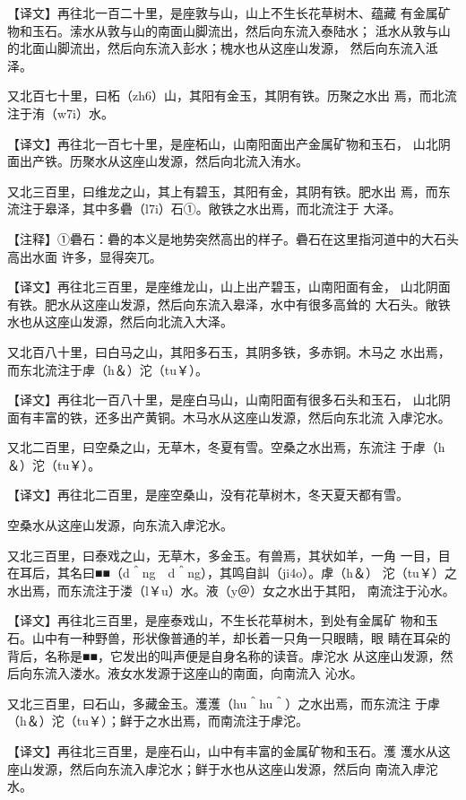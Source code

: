 \documentclass[a4paper,12pt,UTF8,twoside]{ctexbook}
\begin{document}
【译文】再往北一百二十里，是座敦与山，山上不生长花草树木、蕴藏 有金属矿物和玉石。溹水从敦与山的南面山脚流出，然后向东流入泰陆水； 泜水从敦与山的北面山脚流出，然后向东流入彭水；槐水也从这座山发源， 然后向东流入泜泽。

又北百七十里，曰柘（zh6）山，其阳有金玉，其阴有铁。历聚之水出 焉，而北流注于洧（w7i）水。

【译文】再往北一百七十里，是座柘山，山南阳面出产金属矿物和玉石， 山北阴面出产铁。历聚水从这座山发源，然后向北流入洧水。

又北三百里，曰维龙之山，其上有碧玉，其阳有金，其阴有铁。肥水出 焉，而东流注于皋泽，其中多礨（l7i）石①。敞铁之水出焉，而北流注于 大泽。

【注释】①礨石：礨的本义是地势突然高出的样子。礨石在这里指河道中的大石头高出水面 许多，显得突兀。

【译文】再往北三百里，是座维龙山，山上出产碧玉，山南阳面有金， 山北阴面有铁。肥水从这座山发源，然后向东流入皋泽，水中有很多高耸的 大石头。敞铁水也从这座山发源，然后向北流入大泽。

又北百八十里，曰白马之山，其阳多石玉，其阴多铁，多赤铜。木马之 水出焉，而东北流注于虖（h＆）沱（tu￥）。

【译文】再往北一百八十里，是座白马山，山南阳面有很多石头和玉石， 山北阴面有丰富的铁，还多出产黄铜。木马水从这座山发源，然后向东北流 入虖沱水。

又北二百里，曰空桑之山，无草木，冬夏有雪。空桑之水出焉，东流注 于虖（h＆）沱（tu￥）。

【译文】再往北二百里，是座空桑山，没有花草树木，冬天夏天都有雪。

空桑水从这座山发源，向东流入虖沱水。

又北三百里，曰泰戏之山，无草木，多金玉。有兽焉，其状如羊，一角 一目，目在耳后，其名曰■■（d＾ng　d＾ng），其鸣自訆（ji4o）。虖（h＆） 沱（tu￥）之水出焉，而东流注于溇（l￥u）水。液（y＠）女之水出于其阳， 南流注于沁水。

【译文】再往北三百里，是座泰戏山，不生长花草树木，到处有金属矿 物和玉石。山中有一种野兽，形状像普通的羊，却长着一只角一只眼睛，眼 睛在耳朵的背后，名称是■■，它发出的叫声便是自身名称的读音。虖沱水 从这座山发源，然后向东流入溇水。液女水发源于这座山的南面，向南流入 沁水。

又北三百里，曰石山，多藏金玉。濩濩（hu＾hu＾）之水出焉，而东流注 于虖（h＆）沱（tu￥）；鲜于之水出焉，而南流注于虖沱。

【译文】再往北三百里，是座石山，山中有丰富的金属矿物和玉石。濩 濩水从这座山发源，然后向东流入虖沱水；鲜于水也从这座山发源，然后向 南流入虖沱水。
\end{document}
